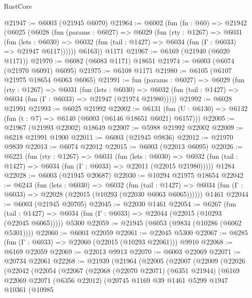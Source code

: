 \begin{lexlean}{RustCore}
\begin{coremodule}
@21947 := @6003 (@21945 @6070)
@21964 := @6002
    (fun (fn : @60) =>
    @21942
      (@6025
        (@6028
          (fun (params : @6027) =>
          @6029
            (fun (rty : @1267) =>
            @6031
              (fun (lets : @6030) =>
              @6032 (fun (tail : @1427) => @6034 (fun (Γ : @6033) => @21947 @6117))))))
        @6163))
    @1171
@21967 := @6169 (@21940 (@6020 @1171))
@21970 := @6082 (@6083 @1171) @18651
@21974 := @6003 (@6074 (@21970 @6091) @6095)
@21975 := @6108 @1171
@21980 := @6105 (@6107 @21975 @18654 @6063 @6065)
@21991 := fun (params : @6027) =>
  @6029
    (fun (rty : @1267) =>
    @6031
      (fun (lets : @6030) =>
      @6032 (fun (tail : @1427) => @6034 (fun (Γ : @6033) => @21947 (@21974 @21980)))))
@21992 := @6028 @21991
@21993 := @6025 @21992
@22002 := @6131
    (fun (U : @6130) => @6132 (fun (t : @7) => @6140 (@6003 (@6146 @18651 @6021) @6157)))
@22005 := @21967 (@21993 @22002) @18649
@22007 := @5988 @21992 @22002
@22009 := @6218 @21991 @1900
@22011 := @6003 (@21945 @9836)
@22012 := @21970 @9839
@22013 := @6074 @22012
@22015 := @6003 (@22013 @6095)
@22026 := @6221
    (fun (rty : @1267) =>
    @6031
      (fun (lets : @6030) =>
      @6032 (fun (tail : @1427) => @6034 (fun (Γ : @6033) => @22011 (@22015 @21980)))))
    @1284
@22028 := @6003 (@21945 @20687)
@22030 := @10294 @21975 @18654
@22042 := @6243
    (fun (lets : @6030) =>
    @6032
      (fun (tail : @1427) =>
      @6034 (fun (Γ : @6033) => @22028 (@22015 (@10293 (@22030 @6063 @6065))))))
    @1461
@22044 := @6003 (@21945 @20705)
@22045 := @22030 @1461
@22054 := @6267
    (fun (tail : @1427) => @6034 (fun (Γ : @6033) => @22044 (@22015 (@10293 (@22045 @6065)))))
    @5300
@22059 := @21945 (@6053 (@9834 (@10286 (@6062 @5301))))
@22060 := @6003 @22059
@22061 := @22045 @5300
@22067 := @6285 (fun (Γ : @6033) => @22060 (@22015 (@10293 @22061))) @9910
@22068 := @6169 @22059
@22069 := @22013 @9913
@22070 := @6003 @22069
@22071 := @20734 @22061
@22268 := @21939
    (@21964
      (@22005
        (@22007
          (@22009
            (@22026
              (@22042
                (@22054
                  (@22067
                    (@22068
                      (@22070 @22071)
                      (@6351 @21944)
                      (@6169
                        @22069
                        @22071
                        (@6356 @22012)
                        (@20745
                          @1169
                          @39
                          @1461
                          @5299
                          @1947
                          @10361
                          (@10985

\end{coremodule}
\end{lexlean}
